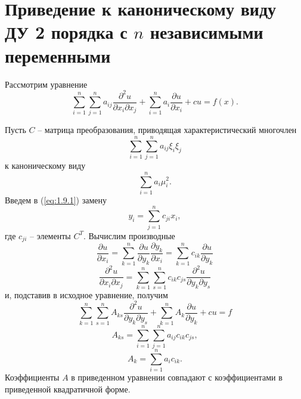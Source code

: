 \documentclass[../main.tex]{subfiles}
\begin{document}
\section{Приведение к каноническому виду ДУ 2 порядка с $n$ независимыми переменными}
Рассмотрим уравнение
\begin{equation}  \label{eq:1.9.1}
	\sum_{i=1}^n\sum_{j=1}^n a_{ij} \frac{\partial^2 u}{\partial x_i \partial x_j} + \sum_{i=1}^n a_i \frac{\partial u}{\partial x_i} + cu = f(x).
\end{equation}

Пусть $C$ -- матрица преобразования, приводящая характеристический многочлен $$\sum_{i=1}^n\sum_{j=1}^n a_{ij} \xi_i \xi_j $$ к каноническому виду
$$\sum_{i=1}^n a_i \mu_i^2.$$
Введем в (\ref{eq:1.9.1}) замену
$$y_i = \sum_{j=1}^n c_{ji}x_i,$$
где $c_{ji}$ -- элементы $C^T$.
Вычислим производные
$$\frac{\partial u}{\partial x_i} = \sum^n_{k=1}\frac{\partial u}{\partial y_k} \frac{\partial y_k}{\partial x_i} = \sum_{k=1}^n c_{ik} \frac{\partial u}{\partial y_k}$$
$$\frac{\partial^2 u}{\partial x_i \partial x_j} = \sum^n_{k=1}\sum^n_{s=1} c_{ik} c_{js} \frac{\partial^2 u}{\partial y_k \partial y_s}$$
и, подставив в исходное уравнение, получим
\begin{equation}
	\boxed{\sum^n_{k=1}\sum^n_{s=1} A_{ks} \frac{\partial^2 u}{\partial y_k \partial y_s} + \sum_{k=1}^n A_k \frac{\partial u}{\partial y_k} + cu = f}
\end{equation}
$$A_{ks} = \sum^n_{i=1}\sum^n_{j=1} a_{ij} c_{ik} c_{js},$$
$$A_k = \sum_{i=1}^n a_i c_{ik}.$$
Коэффициенты $A$ в приведенном уравнении совпадают с коэффициентами в приведенной квадратичной форме.
\end{document}
